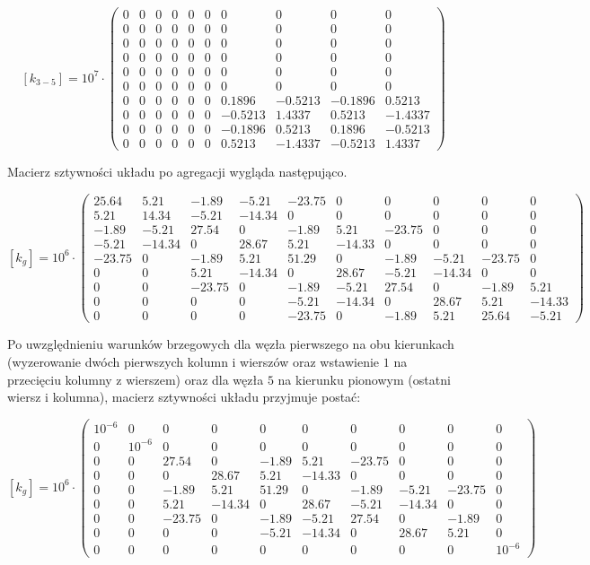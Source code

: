 \documentclass[12pt, a4papper, twoside]{article}
\begin{document}
$$ [k_{3-5}]= 10^7 \cdot \left(\begin{matrix}0&0&0&0&0&0&0&0&0&0\\0&0&0&0&0&0&0&0&0&0\\0&0&0&0&0&0&0&0&0&0\\0&0&0&0&0&0&0&0&0&0\\0&0&0&0&0&0&0&0&0&0\\0&0&0&0&0&0&0&0&0&0\\0&0&0&0&0&0&0.1896&-0.5213&-0.1896&0.5213\\0&0&0&0&0&0&-0.5213&1.4337&0.5213&-1.4337\\0&0&0&0&0&0&-0.1896&0.5213&0.1896&-0.5213\\0&0&0&0&0&0&0.5213&-1.4337&-0.5213&1.4337\end{matrix}\right) $$

\newpage

Macierz sztywności układu po agregacji wygląda następująco.


$$ [k_{g}]= 10^6 \cdot \left(\begin{matrix}25.64&5.21&-1.89&-5.21&-23.75&0&0&0&0&0\\5.21&14.34&-5.21&-14.34&0&0&0&0&0&0\\-1.89&-5.21&27.54&0&-1.89&5.21&-23.75&0&0&0\\-5.21&-14.34&0&28.67&5.21&-14.33&0&0&0&0\\-23.75&0&-1.89&5.21&51.29&0&-1.89&-5.21&-23.75&0\\0&0&5.21&-14.34&0&28.67&-5.21&-14.34&0&0\\0&0&-23.75&0&-1.89&-5.21&27.54&0&-1.89&5.21\\0&0&0&0&-5.21&-14.34&0&28.67&5.21&-14.33\\0&0&0&0&-23.75&0&-1.89&5.21&25.64&-5.21\end{matrix}\right) $$

Po uwzględnieniu warunków brzegowych dla węzła pierwszego na obu kierunkach (wyzerowanie dwóch pierwszych kolumn i wierszów oraz wstawienie $1$ na przecięciu kolumny z wierszem) oraz dla węzła $5$ na kierunku pionowym (ostatni wiersz i kolumna), macierz sztywności układu przyjmuje postać:

$$ [k_{g}]= 10^6 \cdot \left(\begin{matrix} 10^{-6} &0&0&0&0&0&0&0&0&0\\0& 10^{-6} &0&0&0&0&0&0&0&0\\0&0&27.54&0&-1.89&5.21&-23.75&0&0&0\\0&0&0&28.67&5.21&-14.33&0&0&0&0\\0&0&-1.89&5.21&51.29&0&-1.89&-5.21&-23.75&0\\0&0&5.21&-14.34&0&28.67&-5.21&-14.34&0&0\\0&0&-23.75&0&-1.89&-5.21&27.54&0&-1.89&0\\0&0&0&0&-5.21&-14.34&0&28.67&5.21&0\\0&0&0&0&0&0&0&0&0& 10^{-6} \end{matrix}\right) $$
\end{document}
